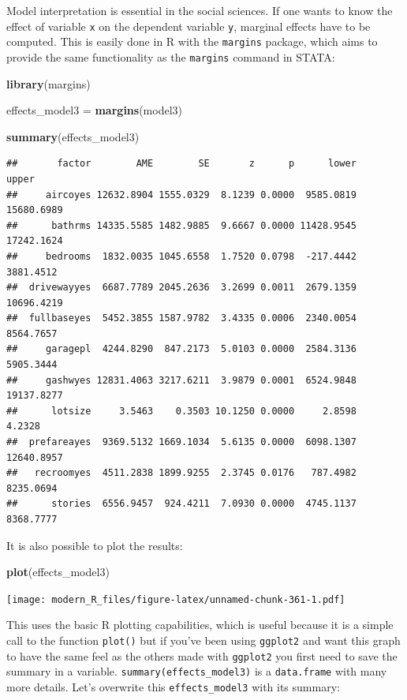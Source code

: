 \documentclass[]{gitbook}
\newenvironment{Shaded}{\begin{snugshade}}{\end{snugshade}}
\newcommand{\KeywordTok}[1]{\textcolor[rgb]{0.13,0.29,0.53}{\textbf{#1}}}
\newcommand{\NormalTok}[1]{#1}
\newcommand{\StringTok}[1]{\textcolor[rgb]{0.31,0.60,0.02}{#1}}
\theoremstyle{definition}
\theoremstyle{definition}
\theoremstyle{definition}
\theoremstyle{remark}
\begin{document}
Model interpretation is essential in the social sciences. If one wants
to know the effect of variable \texttt{x} on the dependent variable
\texttt{y}, marginal effects have to be computed. This is easily done in
R with the \texttt{margins} package, which aims to provide the same
functionality as the \texttt{margins} command in STATA:

\begin{Shaded}
\begin{Highlighting}[]
\KeywordTok{library}\NormalTok{(margins)}

\NormalTok{effects_model3 =}\StringTok{ }\KeywordTok{margins}\NormalTok{(model3)}

\KeywordTok{summary}\NormalTok{(effects_model3)}
\end{Highlighting}
\end{Shaded}

\begin{verbatim}
##       factor        AME        SE       z      p      lower      upper
##     aircoyes 12632.8904 1555.0329  8.1239 0.0000  9585.0819 15680.6989
##      bathrms 14335.5585 1482.9885  9.6667 0.0000 11428.9545 17242.1624
##     bedrooms  1832.0035 1045.6558  1.7520 0.0798  -217.4442  3881.4512
##  drivewayyes  6687.7789 2045.2636  3.2699 0.0011  2679.1359 10696.4219
##  fullbaseyes  5452.3855 1587.9782  3.4335 0.0006  2340.0054  8564.7657
##     garagepl  4244.8290  847.2173  5.0103 0.0000  2584.3136  5905.3444
##     gashwyes 12831.4063 3217.6211  3.9879 0.0001  6524.9848 19137.8277
##      lotsize     3.5463    0.3503 10.1250 0.0000     2.8598     4.2328
##  prefareayes  9369.5132 1669.1034  5.6135 0.0000  6098.1307 12640.8957
##   recroomyes  4511.2838 1899.9255  2.3745 0.0176   787.4982  8235.0694
##      stories  6556.9457  924.4211  7.0930 0.0000  4745.1137  8368.7777
\end{verbatim}

It is also possible to plot the results:

\begin{Shaded}
\begin{Highlighting}[]
\KeywordTok{plot}\NormalTok{(effects_model3)}
\end{Highlighting}
\end{Shaded}

\texttt{[image: modern\_R\_files/figure-latex/unnamed-chunk-361-1.pdf]}

This uses the basic R plotting capabilities, which is useful because it
is a simple call to the function \texttt{plot()} but if you've been
using \texttt{ggplot2} and want this graph to have the same feel as the
others made with \texttt{ggplot2} you first need to save the summary in
a variable. \texttt{summary(effects\_model3)} is a \texttt{data.frame}
with many more details. Let's overwrite this \texttt{effects\_model3}
with its summary:
\end{document}
